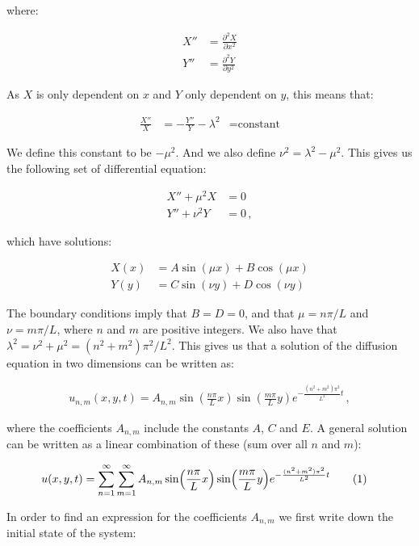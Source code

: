 \documentclass[reprint,english,notitlepage]{revtex4-1}  %
\newcommand\numberthis{\addtocounter{equation}{1}\tag{\theequation}}
\begin{document}
where:

\begin{align*}
X'' &= \frac{\partial^2 X}{\partial x^2} \\
Y'' &= \frac{\partial^2 Y}{\partial y^2}
\end{align*}

As $X$ is only dependent on $x$ and $Y$ only dependent on $y$, this means that:

\begin{align*}
\frac{X''}{X} &= - \frac{Y''}{Y} - \lambda^2 &= \text{constant}
\end{align*}

We define this constant to be $-\mu^2$. And we also define $\nu^2 = \lambda^2 - \mu^2$. This gives us the following set of differential equation:

\begin{align*}
X'' + \mu^2 X &= 0 \\
Y'' + \nu^2 Y &= 0 \, ,
\end{align*}  

which have solutions:

\begin{align*}
X(x) &= A \sin(\mu x) + B\cos(\mu x) \\
Y(y) &= C \sin (\nu y) + D \cos (\nu y)
\end{align*}

The boundary conditions imply that $B=D=0$, and that $\mu = n\pi/L$ and $\nu = m\pi/L$, where $n$ and $m$ are positive integers. We also have that $\lambda^2 = \nu^2 + \mu^2 = (n^2+m^2) \pi^2/L^2$. This gives us that a solution of the diffusion equation in two dimensions can be written as:

\begin{align*}
u_{n,m}(x,y,t) = A_{n,m} \sin (\frac{n\pi}{L} x)  \sin (\frac{m\pi}{L} y) e^{-\frac{(n^2 + m^2)\pi^2}{L^2} t} \, ,
\end{align*}

where the coefficients $A_{n,m}$ include the constants $A$, $C$ and $E$. A general solution can be written as a linear combination of these (sum over all $n$ and $m$):

\begin{align*}
u(x,y,t) &= \sum\limits_{n=1}^\infty \sum\limits_{m=1}^\infty A_{n,m} \sin (\frac{n\pi}{L} x)  \sin (\frac{m\pi}{L} y) e^{-\frac{(n^2 + m^2)\pi^2}{L^2} t} \numberthis \label{eq:2D_diffusion_equation_analytical_solution}
\end{align*} 

In order to find an expression for the coefficients $A_{n,m}$ we first write down the initial state of the system:
\end{document}
